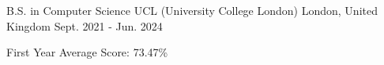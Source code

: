 

\begin{cventries}

  \cventry
    {B.S. in Computer Science} %
    {UCL (University College London)} %
    {London, United Kingdom} %
    {Sept. 2021 - Jun. 2024} %
    {
      \begin{cvitems} %
        \item {First Year Average Score: 73.47\%}
      \end{cvitems}
    }

\end{cventries}
